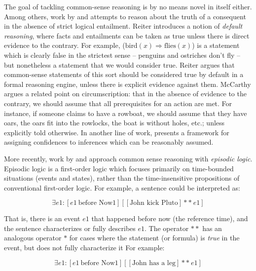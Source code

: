 The goal of tackling common-sense reasoning is by no means novel in
  itself either.
Among others, work by  and 
  attempts to reason about the truth of a consequent in the absence of strict logical entailment.
Reiter introduces a notion of \textit{default reasoning}, where facts and entailments can be
  taken as true unless there is direct evidence to the contrary.
For example,  ($\textrm{bird}(x) \Rightarrow \textrm{flies}(x)$) is a statement which
  is clearly false in the strictest sense -- penguins and ostriches don't fly -- but nonetheless
  a statement that we would consider true.
Reiter argues that common-sense statements of this sort should be considered true by default in
  a formal reasoning engine, unless there is explicit evidence against them.
McCarthy argues a related point on circumscription: that in the absence of evidence to the contrary,
  we should assume that all prerequisites for an action are met.
For instance, if someone claims to have a rowboat, we should assume that they have oars, the oars
  fit into the rowlocks, the boat is without holes, etc.; unless explicitly told otherwise.
In another line of work,  presents a framework for
  assigning confidences to inferences which can be reasonably assumed.

More recently, work by  and
   approach common sense reasoning
  with \textit{episodic logic}.
Episodic logic is a first-order logic which focuses primarily on time-bounded
  situations (events and states), rather than the time-insensitive propositions
  of conventional first-order logic.
For example, a sentence  could be interpreted as:

\begin{equation*}
\exists e1 : [ e1 ~ \textrm{before Now1} ] \left[ [ \textrm{John kick Pluto} ] **~ e1 \right]
\end{equation*}

That is, there is an event $e1$ that happened before now (the reference time), and the
  sentence  characterizes or fully describes $e1$.
The operator $**$ has an analogous operator $*$ for cases where the statement (or formula)
  is \textit{true} in the event, but does not fully characterize it
For example:

\begin{equation*}
\exists e1 : [ e1 ~ \textrm{before Now1} ] \left[ [ \textrm{John has a leg} ] **~ e1 \right]
\end{equation*}


